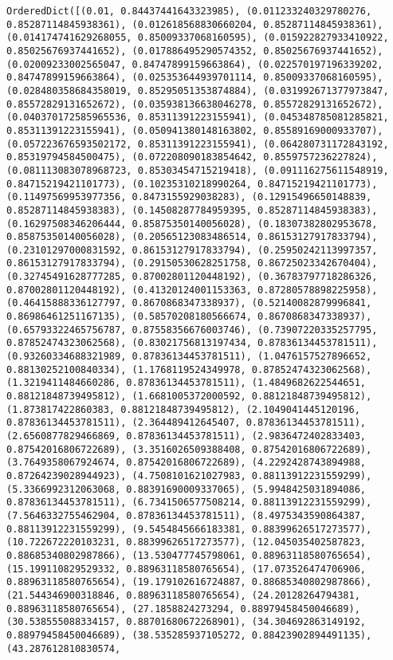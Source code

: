 \documentclass[11pt]{article}
\begin{document}
    \begin{Verbatim}[commandchars=\\\{\}]
OrderedDict([(0.01, 0.84437441643323985), (0.011233240329780276, 0.85287114845938361), (0.012618568830660204, 0.85287114845938361), (0.014174741629268055, 0.85009337068160595), (0.015922827933410922, 0.85025676937441652), (0.017886495290574352, 0.85025676937441652), (0.02009233002565047, 0.84747899159663864), (0.022570197196339202, 0.84747899159663864), (0.025353644939701114, 0.85009337068160595), (0.028480358684358019, 0.85295051353874884), (0.031992671377973847, 0.85572829131652672), (0.035938136638046278, 0.85572829131652672), (0.040370172585965536, 0.85311391223155941), (0.045348785081285821, 0.85311391223155941), (0.050941380148163802, 0.85589169000933707), (0.057223676593502172, 0.85311391223155941), (0.064280731172843192, 0.85319794584500475), (0.072208090183854642, 0.8559757236227824), (0.081113083078968723, 0.85303454715219418), (0.091116275611548919, 0.84715219421101773), (0.10235310218990264, 0.84715219421101773), (0.11497569953977356, 0.8473155929038283), (0.12915496650148839, 0.85287114845938383), (0.14508287784959395, 0.85287114845938383), (0.16297508346206444, 0.85875350140056028), (0.18307382802953678, 0.85875350140056028), (0.20565123083486514, 0.86153127917833794), (0.23101297000831592, 0.86153127917833794), (0.25950242113997357, 0.86153127917833794), (0.29150530628251758, 0.86725023342670404), (0.32745491628777285, 0.87002801120448192), (0.36783797718286326, 0.87002801120448192), (0.41320124001153363, 0.87280578898225958), (0.46415888336127797, 0.8670868347338937), (0.52140082879996841, 0.86986461251167135), (0.58570208180566674, 0.8670868347338937), (0.65793322465756787, 0.87558356676003746), (0.73907220335257795, 0.87852474323062568), (0.83021756813197434, 0.87836134453781511), (0.93260334688321989, 0.87836134453781511), (1.0476157527896652, 0.88130252100840334), (1.1768119524349978, 0.87852474323062568), (1.3219411484660286, 0.87836134453781511), (1.4849682622544651, 0.88121848739495812), (1.6681005372000592, 0.88121848739495812), (1.873817422860383, 0.88121848739495812), (2.1049041445120196, 0.87836134453781511), (2.364489412645407, 0.87836134453781511), (2.6560877829466869, 0.87836134453781511), (2.9836472402833403, 0.87542016806722689), (3.3516026509388408, 0.87542016806722689), (3.7649358067924674, 0.87542016806722689), (4.2292428743894988, 0.87264239028944923), (4.7508101621027983, 0.88113912231559299), (5.3366992312063068, 0.88391690009337065), (5.9948425031894086, 0.87836134453781511), (6.7341506577508214, 0.88113912231559299), (7.5646332755462904, 0.87836134453781511), (8.4975343590864387, 0.88113912231559299), (9.5454845666183381, 0.88399626517273577), (10.722672220103231, 0.88399626517273577), (12.045035402587823, 0.88685340802987866), (13.530477745798061, 0.88963118580765654), (15.199110829529332, 0.88963118580765654), (17.073526474706906, 0.88963118580765654), (19.179102616724887, 0.88685340802987866), (21.544346900318846, 0.88963118580765654), (24.20128264794381, 0.88963118580765654), (27.1858824273294, 0.88979458450046689), (30.538555088334157, 0.88701680672268901), (34.304692863149192, 0.88979458450046689), (38.535285937105272, 0.88423902894491135), (43.287612810830574, 
\end{Verbatim}
\end{document}
